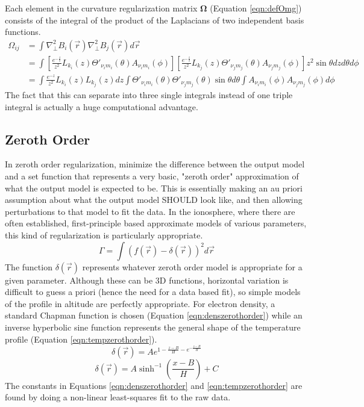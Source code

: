 \documentclass[12pt,letterpaper]{article}
\newcommand{\mat}[1]{\mathbf{#1}}
\begin{document}
    Each element in the curvature regularization matrix \(\mat{\Omega}\) (Equation \ref{eqn:defOmg}) consists of the integral of the product of the Laplacians of two independent basis functions.
    \begin{align}
      \Omega_{ij} &= \int \nabla_\perp^2 B_i(\vec{r}) \nabla_\perp^2 B_j(\vec{r}) d\vec{r} \\
      &= \int \left[\frac{e^{-\frac{z}{2}}}{z^2}L_{k_i}(z)\Theta'_{\nu_i m_i}(\theta)A_{\nu_i m_i}(\phi)\right]\left[\frac{e^{-\frac{z}{2}}}{z^2}L_{k_j}(z)\Theta'_{\nu_j m_j}(\theta)A_{\nu_j m_j}(\phi)\right]z^2\sin\theta dz d\theta d\phi \\
      &= \int \frac{e^{-z}}{z^2}L_{k_i}(z)L_{k_j}(z)dz \int \Theta'_{\nu_i m_i}(\theta)\Theta'_{\nu_j m_j}(\theta)\sin\theta d\theta \int A_{\nu_i m_i}(\phi)A_{\nu_j m_j}(\phi)d\phi
    \end{align}
    The fact that this can separate into three single integrals instead of one triple integral is actually a huge computational advantage.

  \subsection{Zeroth Order}
    In zeroth order regularization, minimize the difference between the output model and a set function that represents a very basic, "zeroth order" approximation of what the output model is expected to be.  This is essentially making an au priori assumption about what the output model SHOULD look like, and then allowing perturbations to that model to fit the data.  In the ionosphere, where there are often established, first-principle based approximate models of various parameters, this kind of regularization is particularly appropriate.
    \begin{equation}
      \label{eqn:residualzerothorder}
      \Gamma = \int \left(f(\vec{r})-\delta(\vec{r})\right)^2 d\vec{r}
    \end{equation}
    The function \(\delta(\vec{r})\) represents whatever zeroth order model is appropriate for a given parameter.  Although these can be 3D functions, horizontal variation is difficult to guess a priori (hence the need for a data based fit), so simple models of the profile in altitude are perfectly appropriate.  For electron density, a standard Chapman function is chosen (Equation \ref{eqn:denszerothorder}) while an inverse hyperbolic sine function represents the general shape of the temperature profile (Equation \ref{eqn:tempzerothorder}).
    \begin{equation}
      \label{eqn:denszerothorder}
      \delta(\vec{r}) = Ae^{1-\frac{z-B}{H}-e^{-\frac{z-B}{H}}}
    \end{equation}
    \begin{equation}
      \label{eqn:tempzerothorder}
      \delta(\vec{r}) = A\sinh^{-1}\left(\frac{x-B}{H}\right)+C
    \end{equation}
    The constants in Equations \ref{eqn:denszerothorder} and \ref{eqn:tempzerothorder} are found by doing a non-linear least-squares fit to the raw data.
\end{document}
